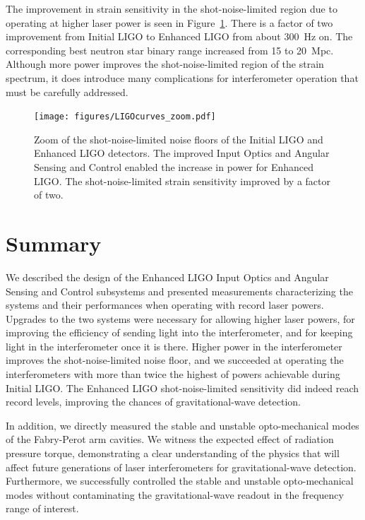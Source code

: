 The improvement in strain sensitivity in the shot-noise-limited region
due to operating at higher laser power is seen in
Figure~\ref{fig:LIGOcurves}. There is a factor of two improvement from
Initial LIGO to Enhanced LIGO from about 300~Hz on. The corresponding
best neutron star binary range increased from 15 to 20~Mpc. Although
more power improves the shot-noise-limited region of the strain
spectrum, it does introduce many complications for interferometer
operation that must be carefully addressed.

\begin{figure}
\begin{centering}
\texttt{[image: figures/LIGOcurves\_zoom.pdf]}
\caption[Zoom of the shot-noise-limited noise floors of the Initial
LIGO and Enhanced LIGO detectors.]{Zoom of the shot-noise-limited
  noise floors of the Initial LIGO and Enhanced LIGO detectors. The
  improved Input Optics and Angular Sensing and Control enabled the
  increase in power for Enhanced LIGO. The shot-noise-limited strain
  sensitivity improved by a factor of two.}
\label{fig:LIGOcurves}
\end{centering}
\end{figure}


\section{Summary}
We described the design of the Enhanced LIGO Input Optics and Angular
Sensing and Control subsystems and presented measurements
characterizing the systems and their performances when operating with
record laser powers. Upgrades to the two systems were necessary for
allowing higher laser powers, for improving the efficiency of sending
light into the interferometer, and for keeping light in the
interferometer once it is there. Higher power in the interferometer
improves the shot-noise-limited noise floor, and we succeeded at
operating the interferometers with more than twice the highest of
powers achievable during Initial LIGO. The Enhanced LIGO
shot-noise-limited sensitivity did indeed reach record levels,
improving the chances of gravitational-wave detection.

In addition, we directly measured the stable and unstable
opto-mechanical modes of the Fabry-Perot arm cavities. We witness the
expected effect of radiation pressure torque, demonstrating a clear
understanding of the physics that will affect future generations of
laser interferometers for gravitational-wave detection. Furthermore,
we successfully controlled the stable and unstable opto-mechanical
modes without contaminating the gravitational-wave readout in the
frequency range of interest.




